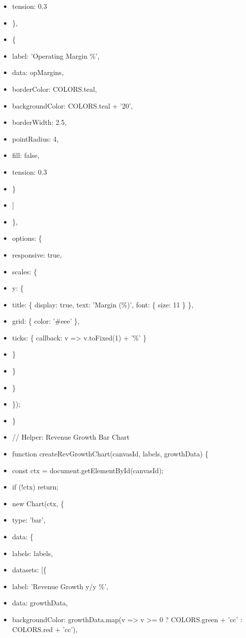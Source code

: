 \documentclass[11pt]{article}
\begin{document}
\begin{itemize}[leftmargin=*,itemsep=2pt,topsep=2pt]
\item {} tension: 0.3
\item {} \},
\item {} \{
\item {} label: 'Operating Margin \%',
\item {} data: opMargins,
\item {} borderColor: COLORS.teal,
\item {} backgroundColor: COLORS.teal + '20',
\item {} borderWidth: 2.5,
\item {} pointRadius: 4,
\item {} fill: false,
\item {} tension: 0.3
\item {} \}
\item {} ]
\item {} \},
\item {} options: \{
\item {} responsive: true,
\item {} scales: \{
\item {} y: \{
\item {} title: \{ display: true, text: 'Margin (\%)', font: \{ size: 11 \} \},
\item {} grid: \{ color: '\#eee' \},
\item {} ticks: \{ callback: v => v.toFixed(1) + '\%' \}
\item {} \}
\item {} \}
\item {} \}
\item {} \});
\item {} \}
\item {} // Helper: Revenue Growth Bar Chart
\item {} function createRevGrowthChart(canvasId, labels, growthData) \{
\item {} const ctx = document.getElementById(canvasId);
\item {} if (!ctx) return;
\item {} new Chart(ctx, \{
\item {} type: 'bar',
\item {} data: \{
\item {} labels: labels,
\item {} datasets: [\{
\item {} label: 'Revenue Growth y/y \%',
\item {} data: growthData,
\item {} backgroundColor: growthData.map(v => v >= 0 ? COLORS.green + 'cc' : COLORS.red + 'cc'),

\end{itemize}
\end{document}
